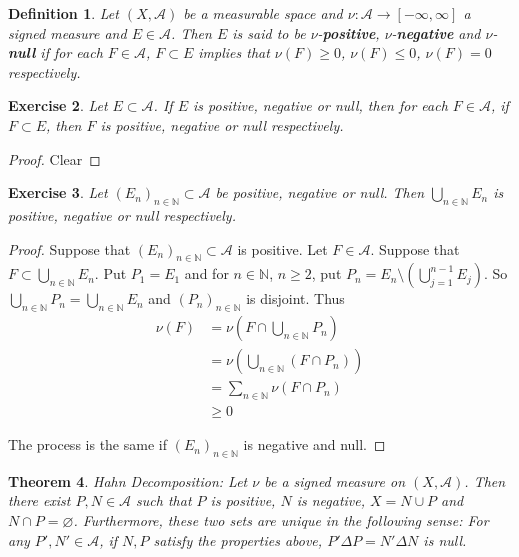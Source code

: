 \documentclass[12pt]{amsart}
\newtheorem{thm}{Theorem}[section]
\newtheorem{defn}[thm]{Definition}
\newtheorem{ex}[thm]{Exercise}
\newcommand{\N}{\mathbb{N}}
\newcommand{\MA}{\mathcal{A}}
\begin{document}
\begin{defn}
Let $(X, \MA)$ be a measurable space and $\nu: \MA \rightarrow [-\infty, \infty]$ a signed measure and $E \in \MA$. Then $E$ is said to be $\nu$-\textbf{positive}, $\nu$-\textbf{negative} and $\nu$-\textbf{null} if for each $F \in \MA$, $F \subset E$ implies that $\nu(F) \geq 0$, $\nu(F) \leq 0$, $\nu(F) = 0$ respectively.
\end{defn}

\begin{ex}
Let $E \subset \MA$. If $E$ is positive, negative or null, then for each $F \in \MA$, if $F \subset E$, then $F$ is positive, negative or null respectively.
\end{ex}

\begin{proof}
Clear
\end{proof}

\begin{ex}
Let $(E_n)_{n \in \N} \subset \MA$ be positive, negative or null. Then $\bigcup\limits_{n \in \N} E_n$ is positive, negative or null respectively. 
\end{ex}

\begin{proof}
Suppose that $(E_n)_{n \in \N} \subset \MA$ is positive. Let $F \in \MA$. Suppose that $F \subset \bigcup\limits_{n \in \N} E_n$. Put $P_1 = E_1$ and for $n \in \N$, $n \geq 2$, put $P_n = E_n \setminus (\bigcup\limits_{j=1}^{n-1} E_j)$. So $\bigcup\limits_{n \in \N} P_n = \bigcup\limits_{n \in \N} E_n$ and $(P_n)_{n \in \N}$ is disjoint. Thus 
\begin{align*}
\nu(F) 
&= \nu(F \cap \bigcup_{n \in \N} P_n)\\
&= \nu(\bigcup_{n \in \N} (F \cap P_n))\\
&= \sum_{n \in \N} \nu(F \cap P_n)\\
& \geq 0 
\end{align*}

The process is the same if $(E_n)_{n \in \N}$ is negative and null.
\end{proof}

\begin{thm}{Hahn Decomposition:}
Let $\nu$ be a signed measure on $(X, \MA)$. Then there exist $P,N \in \MA$ such that $P$ is positive, $N$ is negative, $X = N \cup P$ and $N \cap P = \varnothing$. Furthermore, these two sets are unique in the following sense: For any $P',N' \in \MA$, if $N,P$ satisfy the properties above, $P' \Delta P = N' \Delta N$ is null.
\end{thm}
\end{document}
